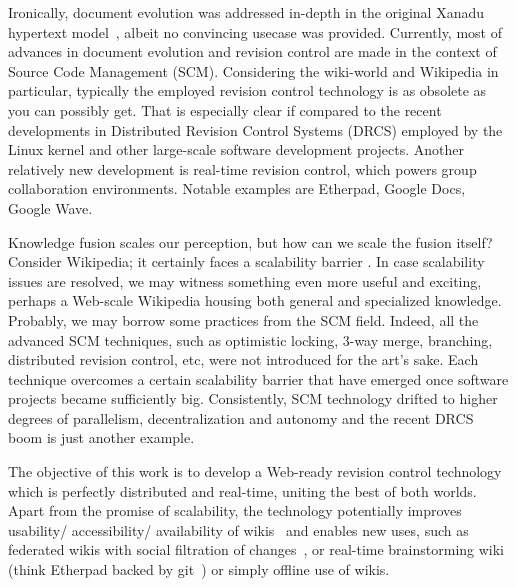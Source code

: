 \documentclass{sig-alternate}
\begin{document}
Ironically, document evolution was addressed in-depth in the original Xanadu hypertext model~\cite{literary}, albeit no convincing usecase was provided.
Currently, most of advances in document evolution and revision control are made in the context of Source Code Management (SCM).
Considering the wiki-world and Wikipedia in particular, typically the employed revision control technology is as obsolete as you can possibly get.
That is especially clear if compared to the recent developments in Distributed Revision Control Systems (DRCS) employed by the Linux kernel and other large-scale software development projects.
Another relatively new development is real-time revision control, which powers group collaboration environments. Notable examples are Etherpad, Google Docs, Google Wave.

Knowledge fusion scales our perception, but how can we scale the fusion itself?
Consider Wikipedia; it certainly faces a scalability barrier \cite{no-singularity, wp-decay}.
In case scalability issues are resolved, we may witness something even more useful and exciting, perhaps a Web-scale Wikipedia housing both general and specialized knowledge.
Probably, we may borrow some practices from the SCM field.
Indeed, all the advanced SCM techniques, such as optimistic locking, 3-way merge, branching, distributed revision control, etc, were not introduced for the art's sake.
Each technique overcomes a certain scalability barrier that have emerged once software projects became sufficiently big.
Consistently, SCM technology drifted to higher degrees of parallelism, decentralization and autonomy and the recent DRCS boom is just another example.

The objective of this work is to develop a Web-ready revision control technology which is perfectly distributed and real-time, uniting the best of both worlds.
Apart from the promise of scalability, the technology potentially improves usability/ accessibility/ availability of wikis~\cite{nahaboo} and enables new uses, such as federated wikis with social filtration of changes~\cite{www06}, or real-time brainstorming wiki (think Etherpad backed by git~\cite{git}) or simply offline use of wikis.
\end{document}
